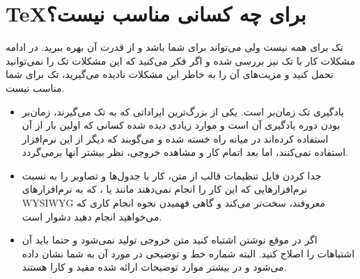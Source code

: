 \documentclass[a4paper,12pt]{report}
\begin{document}
\section*{\TeX برای چه کسانی مناسب نیست؟}

تک برای همه نیست ولی می‌تواند برای شما باشد و از قدرت آن بهره ببرید. در ادامه مشکلات کار با تک نیز بررسی شده و اگر فکر می‌کنید که این مشکلات تک را نمی‌توانید تحمل کنید و مزیت‌های آن را به خاطر این مشکلات نادیده می‌گیرید، تک برای شما مناسب نیست.

\begin{itemize}
\item

یادگیری تک زمان‌بر است. 
یکی از بزرگ‌ترین ایراداتی که به تک می‌گیرند، زمان‌بر بودن دوره یادگیری آن است و موارد زیادی دیده شده کسانی که اولین بار از آن استفاده کرده‌اند در میانه راه خسته شده و می‌گویند که دیگر از این نرم‌افزار استفاده نمی‌کنند، اما بعد اتمام کار و مشاهده خروجی، نظر بیشتر آنها برمی‌گردد.

\item
جدا کردن فایل تنظیمات قالب از متن، کار با جدول‌ها و تصاویر را به نسبت نرم‌افزار‌هایی که این کار را انجام نمی‌دهند مانند
یا
، که به نرم‌افزارهای WYSIWYG 
معروفند، سخت‌تر می‌کند و گاهی فهمیدن نحوه انجام کاری که می‌خواهید انجام دهید دشوار است.

\item
اگر در موقع نوشتن اشتباه کنید متن خروجی تولید نمی‌شود و حتما باید آن اشتباهات را اصلاح کنید. البته شماره خط و توضیحی در مورد آن به شما نشان داده می‌شود و در بیشتر موارد توضیحات ارائه شده مفید و کارا هستند.
\end{itemize}
\end{document}

